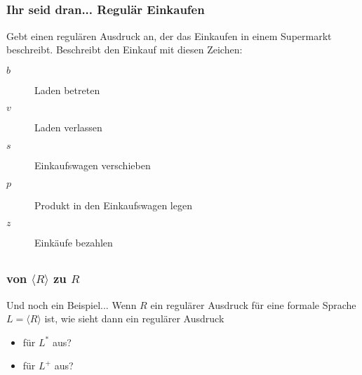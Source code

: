 \subsection*{}
\begin{frame}
  \frametitle{Ihr seid dran... Regulär Einkaufen}
  Gebt einen regulären Ausdruck an, der das Einkaufen in einem Supermarkt
  beschreibt. Beschreibt den Einkauf mit diesen Zeichen:

  \begin{description}
    \item[$b$] Laden betreten
    \item[$v$] Laden verlassen
    \item[$s$] Einkaufswagen verschieben
    \item[$p$] Produkt in den Einkaufswagen legen
    \item[$z$] Einkäufe bezahlen
  \end{description}

\end{frame}

\subsection*{}
\begin{frame}
  \frametitle{von $\langle R \rangle$ zu $R$}
	\begin{block}{Und noch ein Beispiel...}
		Wenn $R$ ein regulärer Ausdruck für eine formale Sprache $L=\langle R \rangle$ ist, wie sieht dann ein regulärer Ausdruck
  		\begin{itemize}
			\item für $L^*$ aus? \visible<2->{  Lösung: $(R)*$}
			\item für $L^+$ aus? \visible<3->{  Lösung: $R(R)*$}
  		\end{itemize}
	\end{block}
\end{frame}


